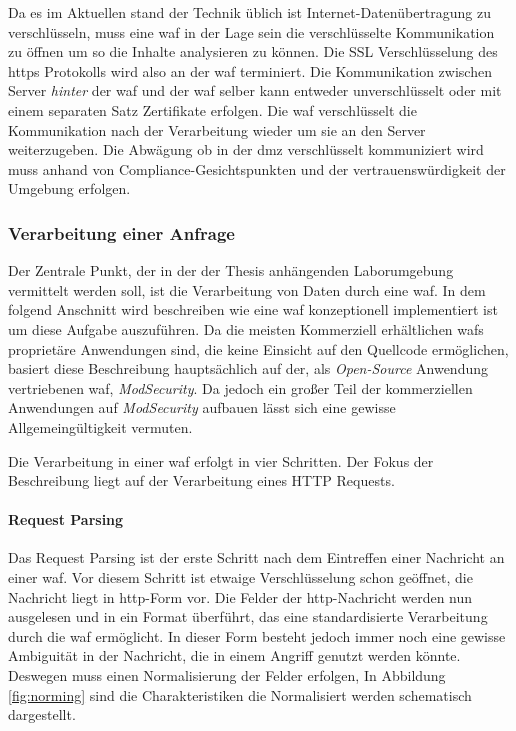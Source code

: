 Da es im Aktuellen stand der Technik üblich ist Internet-Datenübertragung zu verschlüsseln, muss eine \ac{waf} in der Lage sein die verschlüsselte Kommunikation zu öffnen um so die Inhalte analysieren zu können. %
Die SSL Verschlüsselung des \ac{https} Protokolls wird also an der \ac{waf} terminiert.
Die Kommunikation zwischen Server \textit{hinter} der \ac{waf} und der \ac{waf} selber kann entweder unverschlüsselt oder mit einem separaten Satz Zertifikate erfolgen.
Die \ac{waf} verschlüsselt die Kommunikation nach der Verarbeitung wieder um sie an den Server weiterzugeben.
Die Abwägung ob in der \ac{dmz} verschlüsselt kommuniziert wird muss anhand von Compliance-Gesichtspunkten und der vertrauenswürdigkeit der Umgebung erfolgen\cite{guptaWEBAPPLICATIONFIREWALL2007}.%

\subsubsection{Verarbeitung einer Anfrage}\cite{yuanResearchImplementationWEB2019}
Der Zentrale Punkt, der in der der Thesis anhängenden Laborumgebung vermittelt werden soll, ist die Verarbeitung von Daten durch eine \ac{waf}.
In dem folgend Anschnitt wird beschreiben wie eine \ac{waf} konzeptionell implementiert ist um diese Aufgabe auszuführen.
Da die meisten Kommerziell erhältlichen \acp{waf} proprietäre Anwendungen sind, die keine Einsicht auf den Quellcode ermöglichen, basiert diese Beschreibung hauptsächlich auf der, als \textit{Open-Source} Anwendung vertriebenen \ac{waf}, \textit{ModSecurity}.
Da jedoch ein großer Teil der kommerziellen Anwendungen auf \textit{ModSecurity} aufbauen lässt sich eine gewisse Allgemeingültigkeit vermuten.

Die Verarbeitung in einer \ac{waf} erfolgt in vier Schritten. Der Fokus der Beschreibung liegt auf der Verarbeitung eines HTTP Requests.

\paragraph{Request Parsing}
Das Request Parsing ist der erste Schritt nach dem Eintreffen einer Nachricht an einer \ac{waf}.
Vor diesem Schritt ist etwaige Verschlüsselung schon geöffnet, die Nachricht liegt in \ac{http}-Form vor.
Die Felder der \ac{http}-Nachricht werden nun ausgelesen und in ein Format überführt, das eine standardisierte Verarbeitung durch die \ac{waf} ermöglicht.
In dieser Form besteht jedoch immer noch eine gewisse Ambiguität in der Nachricht, die in einem Angriff genutzt werden könnte.
Deswegen muss einen Normalisierung der Felder erfolgen,
In Abbildung \ref{fig:norming} sind die Charakteristiken die Normalisiert werden schematisch dargestellt.

